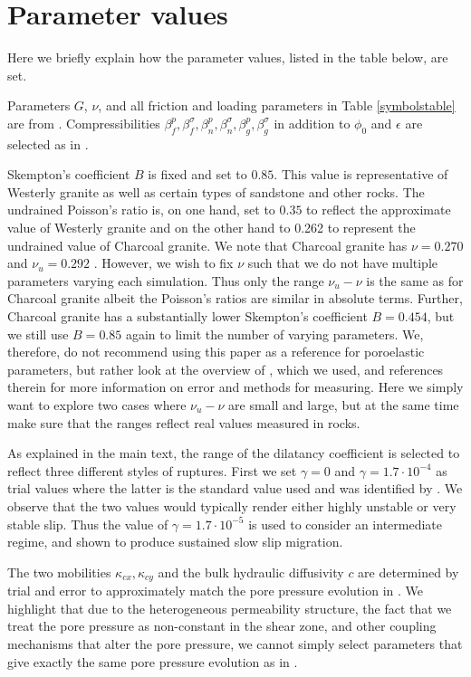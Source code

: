 \documentclass[draft]{agujournal2019}
\begin{document}
\appendix
\section{Parameter values}
Here we briefly explain how the parameter values, listed in the table below, are set.

Parameters $G$, $\nu$, and all friction and loading parameters in Table \ref{symbolstable} are from .
Compressibilities $\beta_f^p,\beta_f^\sigma,\beta_n^p,\beta_n^\sigma,\beta_g^p,\beta_g^\sigma$ in addition to $\phi_0$ and $\epsilon$ are selected as in .

Skempton's coefficient $B$ is fixed and set to $0.85$. This value is representative of Westerly granite as well as certain types of sandstone and other rocks. The undrained Poisson's ratio is, on one hand, set to $0.35$ to reflect the approximate value of Westerly granite and on the other hand to 0.262 to represent the undrained value of Charcoal granite. We note that Charcoal granite has $\nu = 0.270$ and $\nu_u = 0.292$ \cite{Cheng2016}. However, we wish to fix $\nu$ such that we do not have multiple parameters varying each simulation. Thus only the range $\nu_u - \nu$ is the same as for Charcoal granite albeit the Poisson's ratios are similar in absolute terms. Further, Charcoal granite has a substantially lower Skempton's coefficient $B = 0.454$, but we still use $B = 0.85$ again to limit the number of varying parameters. We, therefore, do not recommend using this paper as a reference for poroelastic parameters, but rather look at the overview of , which we used, and references therein for more information on error and methods for measuring. Here we simply want to explore two cases where $\nu_u - \nu$ are small and large, but at the same time make sure that the ranges reflect real values measured in rocks.

As explained in the main text, the range of the dilatancy coefficient is selected to reflect three different styles of ruptures. First we set $\gamma = 0$ and $\gamma = 1.7 \cdot 10^{-4}$ as trial values where the latter is the standard value used and was identified by . We observe that the two values would typically render either highly unstable or very stable slip. Thus the value of $\gamma = 1.7 \cdot 10^{-5}$ is used to consider an intermediate regime, and shown to produce sustained slow slip migration.

The two mobilities $\kappa_{cx}, \kappa_{cy}$ and the bulk hydraulic diffusivity $c$ are determined by trial and error to approximately match the pore pressure evolution in . We highlight that due to the heterogeneous permeability structure, the fact that we treat the pore pressure as non-constant in the shear zone, and other coupling mechanisms that alter the pore pressure, we cannot simply select parameters that give exactly the same pore pressure evolution as in .
\end{document}
